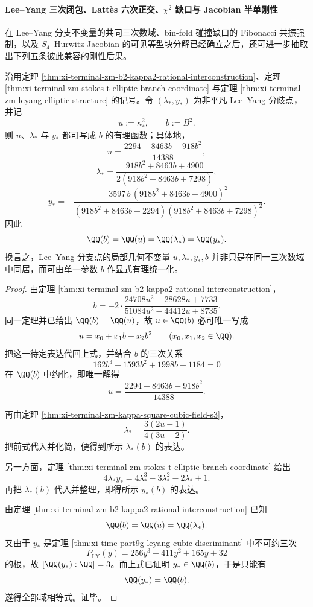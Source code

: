 \paragraph{Lee--Yang 三次闭包、Latt\`es 六次正交、\texorpdfstring{$\chi^2$}{chi2} 缺口与 Jacobian 半单刚性}
在 Lee--Yang 分支不变量的共同三次数域、bin-fold 碰撞缺口的 Fibonacci 共振强制，以及 \(S_4\)--Hurwitz Jacobian 的可见等型块分解已经确立之后，还可进一步抽取出下列五条彼此兼容的刚性后果。

\begin{theorem}\label{thm:xi-time-part65b-leyang-branch-b-birational-uniformization}
沿用定理 \ref{thm:xi-terminal-zm-b2-kappa2-rational-interconstruction}、定理 \ref{thm:xi-terminal-zm-stokes-t-elliptic-branch-coordinate} 与定理 \ref{thm:xi-terminal-zm-leyang-elliptic-structure} 的记号。令 \((\lambda_*,y_*)\) 为非平凡 Lee--Yang 分歧点，并记
\[
u:=\kappa_*^2,
\qquad
b:=B^2.
\]
则 \(u\)、\(\lambda_*\) 与 \(y_*\) 都可写成 \(b\) 的有理函数；具体地，
\[
u=\frac{2294-8463b-918b^2}{14388},
\]
\[
\lambda_*
=
\frac{918b^2+8463b+4900}{2(918b^2+8463b+7298)},
\]
\[
y_*
=
-\frac{3597\,b\,(918b^2+8463b+4900)^2}
{(918b^2+8463b-2294)(918b^2+8463b+7298)^2}.
\]
因此
\[
\QQ(b)=\QQ(u)=\QQ(\lambda_*)=\QQ(y_*).
\]
换言之，Lee--Yang 分支点的局部几何不变量 \(u,\lambda_*,y_*,b\) 并非只是在同一三次数域中同居，而可由单一参数 \(b\) 作显式有理统一化。
\end{theorem}
\begin{proof}
由定理 \ref{thm:xi-terminal-zm-b2-kappa2-rational-interconstruction}，
\[
b
=
-2\cdot
\frac{24708u^2-28628u+7733}{51084u^2-44412u+8735}.
\]
同一定理并已给出 \(\QQ(b)=\QQ(u)\)，故 \(u\in \QQ(b)\) 必可唯一写成
\[
u=x_0+x_1b+x_2b^2
\qquad (x_0,x_1,x_2\in \QQ).
\]
把这一待定表达代回上式，并结合 \(b\) 的三次关系
\[
162b^3+1593b^2+1998b+1184=0
\]
在 \(\QQ(b)\) 中约化，即唯一解得
\[
u=\frac{2294-8463b-918b^2}{14388}.
\]

再由定理 \ref{thm:xi-terminal-zm-kappa-square-cubic-field-s3}，
\[
\lambda_*=\frac{3(2u-1)}{4(3u-2)}.
\]
把前式代入并化简，便得到所示 \(\lambda_*(b)\) 的表达。

另一方面，定理 \ref{thm:xi-terminal-zm-stokes-t-elliptic-branch-coordinate} 给出
\[
4\lambda_*y_*=4\lambda_*^3-3\lambda_*^2-2\lambda_*+1.
\]
再把 \(\lambda_*(b)\) 代入并整理，即得所示 \(y_*(b)\) 的表达。

由定理 \ref{thm:xi-terminal-zm-b2-kappa2-rational-interconstruction} 已知
\[
\QQ(b)=\QQ(u)=\QQ(\lambda_*).
\]
又由于 \(y_*\) 是定理 \ref{thm:xi-time-part9g-leyang-cubic-discriminant} 中不可约三次
\[
P_{\mathrm{LY}}(y)=256y^3+411y^2+165y+32
\]
的根，故 \([\QQ(y_*):\QQ]=3\)。而上式已证明 \(y_*\in \QQ(b)\)，于是只能有
\[
\QQ(y_*)=\QQ(b).
\]
遂得全部域相等式。证毕。
\end{proof}

